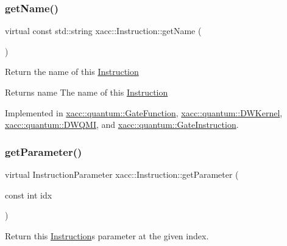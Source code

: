 \mbox{\label{a01657_ac7ff23f693e2276edbf3fdac5452792c}} 
\subsubsection{\texorpdfstring{get\+Name()}{getName()}}
{\footnotesize\ttfamily virtual const std\+::string xacc\+::\+Instruction\+::get\+Name (\begin{DoxyParamCaption}{ }\end{DoxyParamCaption})\hspace{0.3cm}{\ttfamily [pure virtual]}}

Return the name of this \hyperlink{a01657}{Instruction}

\begin{DoxyReturn}{Returns}
name The name of this \hyperlink{a01657}{Instruction} 
\end{DoxyReturn}


Implemented in \hyperlink{a01249_af42efb6191267164717d53c469e15d3a}{xacc\+::quantum\+::\+Gate\+Function}, \hyperlink{a01221_a7f0c4d3c73029566561cf56a474bcbbd}{xacc\+::quantum\+::\+D\+W\+Kernel}, \hyperlink{a01225_ad93428eb61adade7bb99c7633bb02aca}{xacc\+::quantum\+::\+D\+W\+Q\+MI}, and \hyperlink{a01253_a0db03b9e46eeba1134f0ca2b83ccc842}{xacc\+::quantum\+::\+Gate\+Instruction}.

\mbox{\label{a01657_aa0d9de97a4833a042379647f83c33ab6}} 
\subsubsection{\texorpdfstring{get\+Parameter()}{getParameter()}}
{\footnotesize\ttfamily virtual Instruction\+Parameter xacc\+::\+Instruction\+::get\+Parameter (\begin{DoxyParamCaption}\item[{const int}]{idx }\end{DoxyParamCaption})\hspace{0.3cm}{\ttfamily [pure virtual]}}

Return this \hyperlink{a01657}{Instruction}\textquotesingle{}s parameter at the given index.


